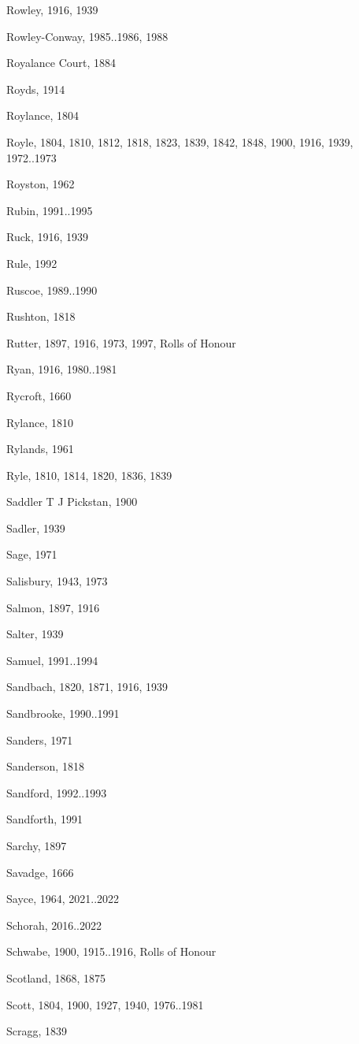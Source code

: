 \begin{theindex}
\item Rowley, 1916, 1939
\item Rowley-Conway, 1985..1986, 1988
\item Royalance Court, 1884
\item Royds, 1914
\item Roylance, 1804
\item Royle, 1804, 1810, 1812, 1818, 1823, 1839, 1842, 1848, 1900, 1916, 1939, 1972..1973
\item Royston, 1962
\item Rubin, 1991..1995
\item Ruck, 1916, 1939
\item Rule, 1992
\item Ruscoe, 1989..1990
\item Rushton, 1818
\item Rutter, 1897, 1916, 1973, 1997, Rolls of Honour
\item Ryan, 1916, 1980..1981
\item Rycroft, 1660
\item Rylance, 1810
\item Rylands, 1961
\item Ryle, 1810, 1814, 1820, 1836, 1839
\item Saddler T J Pickstan, 1900
\item Sadler, 1939
\item Sage, 1971
\item Salisbury, 1943, 1973
\item Salmon, 1897, 1916
\item Salter, 1939
\item Samuel, 1991..1994
\item Sandbach, 1820, 1871, 1916, 1939
\item Sandbrooke, 1990..1991
\item Sanders, 1971
\item Sanderson, 1818
\item Sandford, 1992..1993
\item Sandforth, 1991
\item Sarchy, 1897
\item Savadge, 1666
\item Sayce, 1964, 2021..2022
\item Schorah, 2016..2022
\item Schwabe, 1900, 1915..1916, Rolls of Honour
\item Scotland, 1868, 1875
\item Scott, 1804, 1900, 1927, 1940, 1976..1981
\item Scragg, 1839

\end{theindex}
